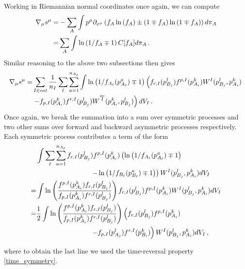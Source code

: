 Working in Riemannian normal coordinates once again, we can compute
\begin{align}
\nabla_\mu s^\mu=&-\sum_A\int p^\mu \partial_{x^\mu}\left(f_A\ln\left(f_A\right)\pm\left(1\mp f_A\right)\ln\left(1\mp f_A\right)\right)d\pi_A\\
=&\sum_A\int\ln\left(1/f_A\mp 1\right)C[f_A]d\pi_A\,.\notag
\end{align}
Similar reasoning to the above two subsections then gives
\begin{align}
\nabla_\mu s^\mu=&\sum_{I\in int}\frac{1}{n_I}\sum_\ell\sum_{a=1}^{n_{A_\ell}}\int\ln\left(1/f_{A_\ell}(p_{A_\ell}^a)\mp1\right)\left(f_{r,I}(p_{B_j}^l)f^{p,I}(p_{A_i}^k)W^I(p_{B_j}^l,p_{A_i}^k) \right.\\
&\left. -f_{p,I}(p_{A_i}^k)f^{r,I}(p_{B_j}^l)W^{\overleftarrow{I}}(p_{A_i}^k,p_{B_j}^l)\right)  dV_I\,.\notag
\end{align}
Once again, we break the summation into a sum over symmetric processes and two other sums over forward and backward asymmetric processes respectively. Each symmetric process contributes a term of the form
\begin{align}
&\int\sum_\ell\sum_{a=1}^{n_{A_\ell}}f_{r,I}(p_{B_j}^l)f^{p,I}(p_{A_i}^k)\left(\ln\left(1/f_{A_\ell}(p_{A_\ell}^a)\mp 1\right)\right.\\
&\left.\qquad\qquad\qquad\qquad-\ln\left(1/f_{B_\ell}(p_{B_\ell}^a)\mp 1\right)\right) W^I(p_{B_j}^l,p_{A_i}^k) dV_I\notag\\
=& \int\ln\left(\frac{f^{p,I}(p_{A_i}^k)f_{r,I}(p_{B_j}^l)}{f_{p,I}(p_{A_i}^k)f^{r,I}(p_{B_j}^l)}\right) f_{r,I}(p_{B_j}^l)f^{p,I}(p_{A_i}^k)W^I(p_{B_j}^l,p_{A_i}^k) dV_I\notag\\
=& \frac{1}{2}\int\ln\left(\frac{f^{p,I}(p_{A_i}^k)f_{r,I}(p_{B_j}^l)}{f_{p,I}(p_{A_i}^k)f^{r,I}(p_{B_j}^l)}\right)\left( f_{r,I}(p_{B_j}^l)f^{p,I}(p_{A_i}^k)\right.\notag\\
&\left.\qquad\qquad\qquad\qquad- f_{p,I}(p_{A_j}^l)f^{r,I}(p_{B_i}^k)\right)W^I(p_{B_j}^l,p_{A_i}^k) dV_I\,,\notag
\end{align}
\begin{comment}
\begin{align}
&\int\ln\left(\frac{f^{p,I}(p_{A_i}^k)f_{r,I}(p_{B_j}^l)}{f_{p,I}(p_{A_i}^k)f^{r,I}(p_{B_j}^l)}\right) f_{r,I}(p_{B_j}^l)f^{p,I}(p_{A_i}^k)W^I(p_{B_j}^l,p_{A_i}^k) dV\\
=&\int\ln\left(\frac{f^{p,I}(p_{B_i}^k)f_{r,I}(p_{A_j}^l)}{f_{p,I}(p_{B_i}^k)f^{r,I}(p_{A_j}^l)}\right) f_{r,I}(p_{A_j}^l)f^{p,I}(p_{B_i}^k)W^I(p_{B_j}^l,p_{A_i}^k) dV\\
=&-\int\ln\left(\frac{f_{p,I}(p_{B_i}^k)f^{r,I}(p_{A_j}^l)}{f^{p,I}(p_{B_i}^k)f_{r,I}(p_{A_j}^l)}\right) f_{r,I}(p_{A_j}^l)f^{p,I}(p_{B_i}^k)W^I(p_{B_j}^l,p_{A_i}^k) dV
\end{align}
\end{comment}
where to obtain the last line we used the time-reversal property  \eqref{time_symmetry}.

